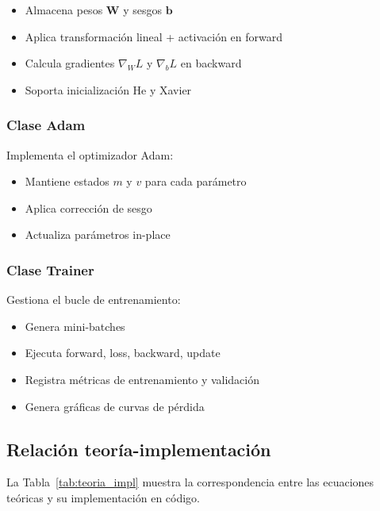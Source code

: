 \documentclass[a4paper,11pt]{article}
\begin{document}
\begin{itemize}
    \item Almacena pesos $\mathbf{W}$ y sesgos $\mathbf{b}$
    \item Aplica transformación lineal + activación en forward
    \item Calcula gradientes $\nabla_W L$ y $\nabla_b L$ en backward
    \item Soporta inicialización He y Xavier
\end{itemize}

\subsubsection{Clase Adam}

Implementa el optimizador Adam:

\begin{itemize}
    \item Mantiene estados $m$ y $v$ para cada parámetro
    \item Aplica corrección de sesgo
    \item Actualiza parámetros in-place
\end{itemize}

\subsubsection{Clase Trainer}

Gestiona el bucle de entrenamiento:

\begin{itemize}
    \item Genera mini-batches
    \item Ejecuta forward, loss, backward, update
    \item Registra métricas de entrenamiento y validación
    \item Genera gráficas de curvas de pérdida
\end{itemize}

\subsection{Relación teoría-implementación}

La Tabla~\ref{tab:teoria_impl} muestra la correspondencia entre las ecuaciones teóricas y su implementación en código.
\end{document}
